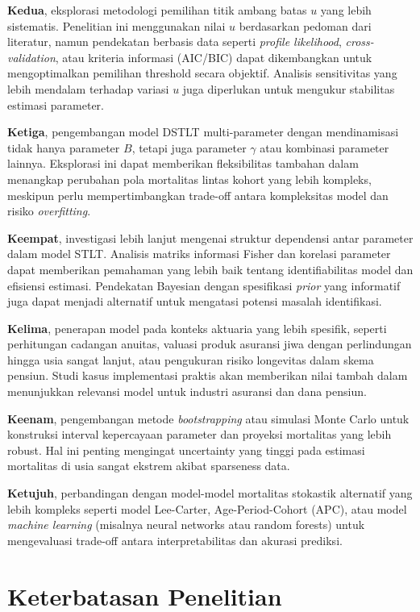 \textbf{Kedua}, eksplorasi metodologi pemilihan titik ambang batas $u$ yang lebih sistematis. Penelitian ini menggunakan nilai $u$ berdasarkan pedoman dari literatur, namun pendekatan berbasis data seperti \textit{profile likelihood}, \textit{cross-validation}, atau kriteria informasi (AIC/BIC) dapat dikembangkan untuk mengoptimalkan pemilihan threshold secara objektif. Analisis sensitivitas yang lebih mendalam terhadap variasi $u$ juga diperlukan untuk mengukur stabilitas estimasi parameter.

\textbf{Ketiga}, pengembangan model DSTLT multi-parameter dengan mendinamisasi tidak hanya parameter $B$, tetapi juga parameter $\gamma$ atau kombinasi parameter lainnya. Eksplorasi ini dapat memberikan fleksibilitas tambahan dalam menangkap perubahan pola mortalitas lintas kohort yang lebih kompleks, meskipun perlu mempertimbangkan trade-off antara kompleksitas model dan risiko \textit{overfitting}.

\textbf{Keempat}, investigasi lebih lanjut mengenai struktur dependensi antar parameter dalam model STLT. Analisis matriks informasi Fisher dan korelasi parameter dapat memberikan pemahaman yang lebih baik tentang identifiabilitas model dan efisiensi estimasi. Pendekatan Bayesian dengan spesifikasi \textit{prior} yang informatif juga dapat menjadi alternatif untuk mengatasi potensi masalah identifikasi.

\textbf{Kelima}, penerapan model pada konteks aktuaria yang lebih spesifik, seperti perhitungan cadangan anuitas, valuasi produk asuransi jiwa dengan perlindungan hingga usia sangat lanjut, atau pengukuran risiko longevitas dalam skema pensiun. Studi kasus implementasi praktis akan memberikan nilai tambah dalam menunjukkan relevansi model untuk industri asuransi dan dana pensiun.

\textbf{Keenam}, pengembangan metode \textit{bootstrapping} atau simulasi Monte Carlo untuk konstruksi interval kepercayaan parameter dan proyeksi mortalitas yang lebih robust. Hal ini penting mengingat uncertainty yang tinggi pada estimasi mortalitas di usia sangat ekstrem akibat sparseness data.

\textbf{Ketujuh}, perbandingan dengan model-model mortalitas stokastik alternatif yang lebih kompleks seperti model Lee-Carter, Age-Period-Cohort (APC), atau model \textit{machine learning} (misalnya neural networks atau random forests) untuk mengevaluasi trade-off antara interpretabilitas dan akurasi prediksi.

\section{Keterbatasan Penelitian}

